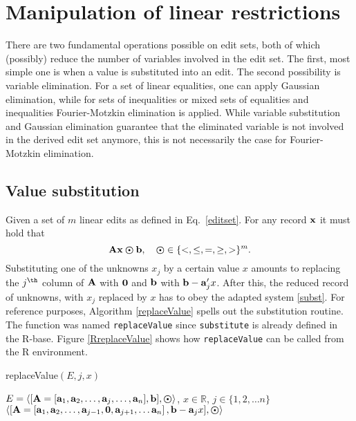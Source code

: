\documentclass[10pt, fleqn, a4paper]{article}
\begin{document}
\section{Manipulation of linear restrictions}
There are two fundamental operations possible on edit sets, both of which
(possibly) reduce the number of variables involved in the edit set. The first,
most simple one is when a value is substituted into an edit. The second
possibility is variable elimination. For a set of linear equalities, one can
apply Gaussian elimination, while for sets of inequalities or mixed sets of
equalities and inequalities Fourier-Motzkin elimination is applied. While
variable substitution and Gaussian elimination guarantee that the eliminated
variable is not involved in the derived edit set anymore, this is not
necessarily the case for Fourier-Motzkin elimination.



\subsection{Value substitution}
Given a set of $m$ linear edits as defined in Eq.\ \eqref{editset}. For
any record $\bf x$ it must hold that
\begin{equation}
{\bf Ax}\boldsymbol{\odot}  {\bf b},\quad \boldsymbol{\odot}\in\{<,\leq,=,\geq,>\}^m.
\label{subst}
\end{equation}
Substituting one of the unknowns $x_j$ by a certain value $x$ amounts to
replacing the $j^{\th}$ column of $\bf A$ with ${\bf 0}$ and ${\bf b}$ with
${\bf b}-{\bf a}_j'x$. After this, the reduced record of unknowns, with $x_j$
replaced by $x$ has to obey the adapted system \eqref{subst}. For reference
purposes, Algorithm \ref{replaceValue} spells out the substitution routine.
The function was named {\tt replaceValue} since {\tt substitute} is already
defined in the R-base. Figure \ref{RreplaceValue} shows how {\tt replaceValue}
can be called from the R environment.
%
%
\begin{algorithm}[t]
\caption{{\sc replaceValue}$(E,j,x)$}
\label{replaceValue}
\begin{algorithmic}
\Require $E=\langle [{\bf A}=[{\bf a}_1,{\bf a}_2,\ldots,{\bf a}_j ,\ldots, {\bf a}_n],{\bf b}],\boldsymbol{\odot}\rangle$, 
    $x\in\mathbb{R}$, $j\in \{1,2,\ldots n\}$
\Ensure $\left\langle\left[{\bf A}=[{\bf a}_1,{\bf a}_2,\ldots,{\bf a}_{j-1},{\bf 0},{\bf a}_{j+1},\ldots {\bf a}_n\right],
    {\bf b}-{\bf a}_jx],\boldsymbol{\odot}\right\rangle$
\end{algorithmic}
\end{algorithm}
\end{document}
